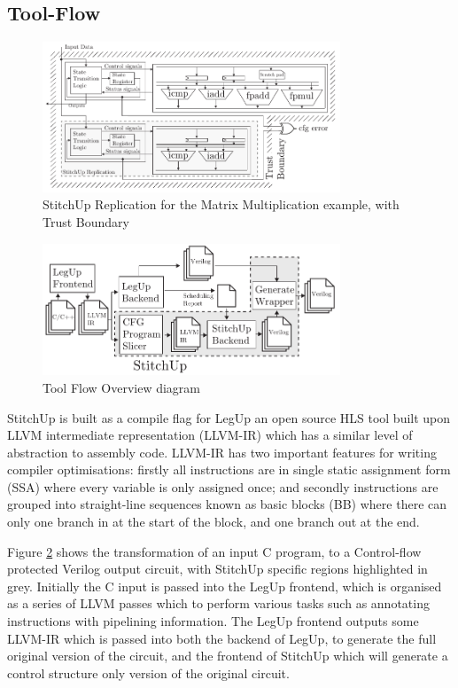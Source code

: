 
\subsection{Tool-Flow}


\begin{figure}[t]
\centering
\includegraphics[width=3.5in]{./imgs/StitchUpReplication.pdf}
\caption{StitchUp Replication for the Matrix Multiplication example, with Trust Boundary}
\label{fig:HLSArch}
\end{figure}


\begin{figure}[h]
\centering
\includegraphics[width=3.5in]{./imgs/tool-flow.pdf}
\caption{Tool Flow Overview diagram}
\label{fig:tool_flow_diagram}
\end{figure}

StitchUp is built as a compile flag for LegUp an open source HLS tool built upon LLVM intermediate representation (LLVM-IR) which has
a similar level of abstraction to assembly code.
LLVM-IR has two important features for writing compiler optimisations:
firstly all instructions are in single static assignment form (SSA) where every variable is only
assigned once; and secondly instructions are grouped into straight-line sequences known as basic blocks (BB)
where there can only one branch in at the start of the block, and one branch out at the end.

Figure \ref{fig:tool_flow_diagram} shows the transformation of an input C program, to a Control-flow protected
Verilog output circuit, with StitchUp specific regions highlighted in grey.
Initially the C input is passed into the LegUp frontend, which is organised as a series of LLVM passes which
to perform various tasks such as annotating instructions with pipelining information.
The LegUp frontend outputs some LLVM-IR which is passed into both the backend of LegUp, to generate the full
original version of the circuit, and the frontend of StitchUp which will generate a control structure only version
of the original circuit.


